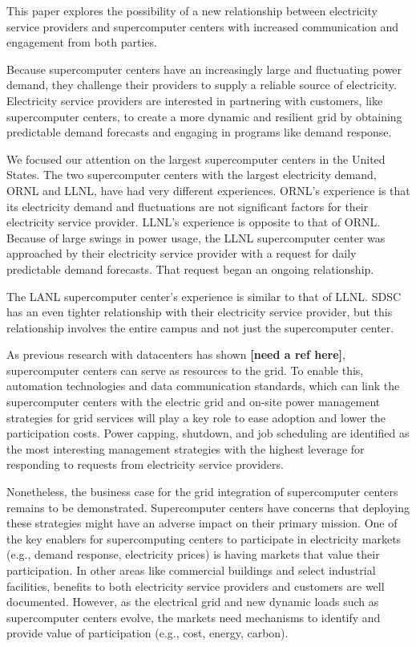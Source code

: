 This paper explores the possibility of a new relationship between electricity service providers
and supercomputer centers with increased communication and engagement from both parties.

Because supercomputer centers have an increasingly large and fluctuating
power demand, they challenge their providers to supply a reliable
source of electricity.
Electricity service providers are interested in partnering with customers,
like supercomputer centers, to create a more dynamic and resilient grid
by obtaining predictable demand forecasts and engaging in programs like 
demand response.

We focused our attention on the largest supercomputer centers in the United States. The two supercomputer 
centers with the largest electricity demand, ORNL and LLNL, have had very different experiences.  
ORNL's experience is that its electricity demand and fluctuations are not significant factors for their 
electricity service provider.  
LLNL's experience is opposite to that of ORNL.  Because of large swings in 
power usage, the LLNL supercomputer center was approached by their electricity service provider with a 
request for daily predictable demand forecasts. That request began an ongoing relationship.  

The LANL supercomputer center's experience is similar to that of LLNL. SDSC has an even tighter relationship 
with their electricity service provider, but this relationship involves the entire campus and not just the 
supercomputer center.  

As previous research with datacenters has shown \textbf{[need a ref here]}, supercomputer centers can serve as   
resources to the grid. To enable this, automation technologies and data communication standards, 
which can link the supercomputer centers with the electric grid and on-site power management strategies 
for grid services will play a key role to ease adoption and lower the participation costs.  Power capping, 
shutdown, and job scheduling are identified as the most interesting management strategies with the highest 
leverage for responding to requests from electricity service providers.  

Nonetheless, the business case for the grid integration of supercomputer centers remains to be demonstrated.  
Supercomputer centers have concerns that deploying these strategies might have an adverse impact on 
their primary mission. One of the key enablers for supercomputing centers to participate in 
electricity markets (e.g., demand response, electricity prices) is having markets that value their 
participation. In other areas like commercial buildings and select industrial facilities, benefits to 
both electricity service providers and customers are well documented. However, as the electrical grid 
and new dynamic loads such as supercomputer centers evolve, the markets need mechanisms to identify 
and provide value of participation (e.g., cost, energy, carbon).

